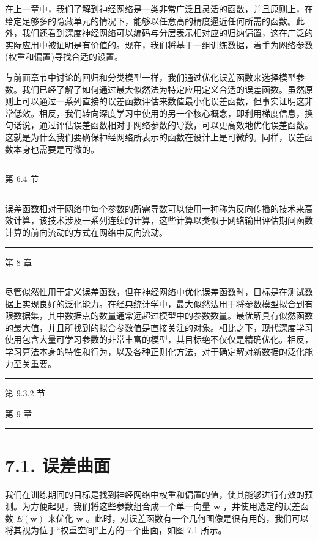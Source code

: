 \documentclass[10pt]{article}
\newcommand{\HRule}{\begin{center}\rule{0.9\linewidth}{0.2mm}\end{center}}
\begin{document}
在上一章中，我们了解到神经网络是一类非常广泛且灵活的函数，并且原则上，在给定足够多的隐藏单元的情况下，能够以任意高的精度逼近任何所需的函数。此外，我们还看到深度神经网络可以编码与分层表示相对应的归纳偏置，这在广泛的实际应用中被证明是有价值的。现在，我们将基于一组训练数据，着手为网络参数(权重和偏置)寻找合适的设置。

与前面章节中讨论的回归和分类模型一样，我们通过优化误差函数来选择模型参数。我们已经了解了如何通过最大似然法为特定应用定义合适的误差函数。虽然原则上可以通过一系列直接的误差函数评估来数值最小化误差函数，但事实证明这非常低效。相反，我们转向深度学习中使用的另一个核心概念，即利用梯度信息，换句话说，通过评估误差函数相对于网络参数的导数，可以更高效地优化误差函数。这就是为什么我们要确保神经网络所表示的函数在设计上是可微的。同样，误差函数本身也需要是可微的。

\HRule

第 6.4 节

\HRule

误差函数相对于网络中每个参数的所需导数可以使用一种称为反向传播的技术来高效计算，该技术涉及一系列连续的计算，这些计算以类似于网络输出评估期间函数计算的前向流动的方式在网络中反向流动。

\HRule

第 8 章

\HRule

尽管似然性用于定义误差函数，但在神经网络中优化误差函数时，目标是在测试数据上实现良好的泛化能力。在经典统计学中，最大似然法用于将参数模型拟合到有限数据集，其中数据点的数量通常远超过模型中的参数数量。最优解具有似然函数的最大值，并且所找到的拟合参数值是直接关注的对象。相比之下，现代深度学习使用包含大量可学习参数的非常丰富的模型，其目标绝不仅仅是精确优化。相反，学习算法本身的特性和行为，以及各种正则化方法，对于确定解对新数据的泛化能力至关重要。

\HRule

第 9.3.2 节

第 9 章

\HRule

\section*{7.1. 误差曲面}

我们在训练期间的目标是找到神经网络中权重和偏置的值，使其能够进行有效的预测。为方便起见，我们将这些参数组合成一个单一向量 \(\mathbf{w}\) ，并使用选定的误差函数 \(E\left( \mathbf{w}\right)\) 来优化 \(\mathbf{w}\) 。此时，对误差函数有一个几何图像是很有用的，我们可以将其视为位于“权重空间”上方的一个曲面，如图 7.1 所示。
\end{document}
